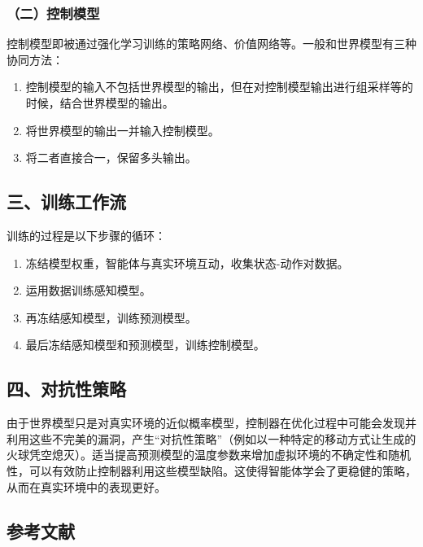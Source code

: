 \hypertarget{ux4e8cux63a7ux5236ux6a21ux578b}{%
\subsubsection{（二）控制模型}\label{ux4e8cux63a7ux5236ux6a21ux578b}}

控制模型即被通过强化学习训练的策略网络、价值网络等。一般和世界模型有三种协同方法：

\begin{enumerate}
\def\labelenumi{\arabic{enumi}.}
\item
  控制模型的输入不包括世界模型的输出，但在对控制模型输出进行组采样等的时候，结合世界模型的输出。
\item
  将世界模型的输出一并输入控制模型。
\item
  将二者直接合一，保留多头输出。
\end{enumerate}

\hypertarget{ux4e09ux8badux7ec3ux5de5ux4f5cux6d41-3}{%
\subsection{三、训练工作流}\label{ux4e09ux8badux7ec3ux5de5ux4f5cux6d41-3}}

训练的过程是以下步骤的循环：

\begin{enumerate}
\def\labelenumi{\arabic{enumi}.}
\item
  冻结模型权重，智能体与真实环境互动，收集状态-动作对数据。
\item
  运用数据训练感知模型。
\item
  再冻结感知模型，训练预测模型。
\item
  最后冻结感知模型和预测模型，训练控制模型。
\end{enumerate}

\hypertarget{ux56dbux5bf9ux6297ux6027ux7b56ux7565}{%
\subsection{四、对抗性策略}\label{ux56dbux5bf9ux6297ux6027ux7b56ux7565}}

由于世界模型只是对真实环境的近似概率模型，控制器在优化过程中可能会发现并利用这些不完美的漏洞，产生``对抗性策略''（例如以一种特定的移动方式让生成的火球凭空熄灭）。适当提高预测模型的温度参数来增加虚拟环境的不确定性和随机性，可以有效防止控制器利用这些模型缺陷。这使得智能体学会了更稳健的策略，从而在真实环境中的表现更好。

\hypertarget{ux53c2ux8003ux6587ux732e-183}{%
\subsection{参考文献}\label{ux53c2ux8003ux6587ux732e-183}}


